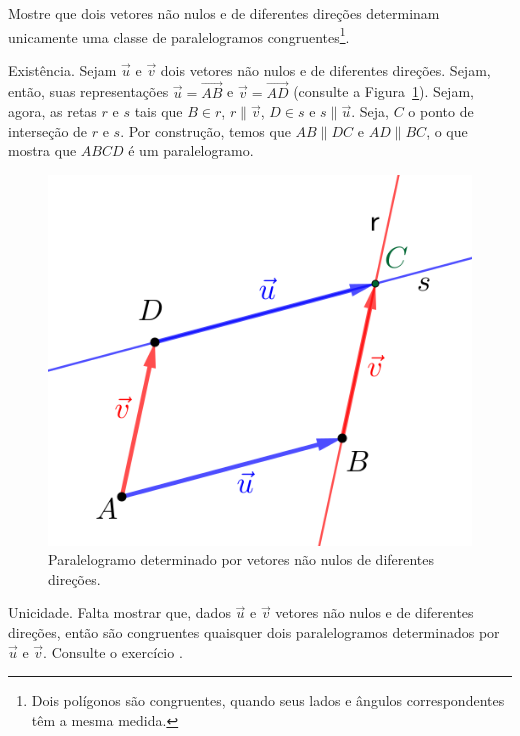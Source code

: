 \begin{exeresol}\label{cap_vetor_sec_vetor:exeresol:vetores_e_paralelogramos}
  Mostre que dois vetores não nulos e de diferentes direções determinam unicamente uma classe de paralelogramos congruentes\footnote{Dois polígonos são congruentes, quando seus lados e ângulos correspondentes têm a mesma medida.}.
\end{exeresol}
\begin{resol}
  Existência. Sejam $\vec{u}$ e $\vec{v}$ dois vetores não nulos e de diferentes direções. Sejam, então, suas representações $\vec{u}=\overrightarrow{AB}$ e $\vec{v}=\overrightarrow{AD}$ (consulte a Figura~\ref{cap_vetor_sec_vetor:fig:vetores_e_paralelogramos}). Sejam, agora, as retas $r$ e $s$ tais que $B\in r$, $r\parallel\vec{v}$, $D\in s$ e $s\parallel\vec{u}$. Seja, $C$ o ponto de interseção de $r$ e $s$. Por construção, temos que $AB\parallel DC$ e $AD\parallel BC$, o que mostra que $ABCD$ é um paralelogramo.

  \begin{figure}[h!]
    \centering
    \includegraphics{./cap_vetor/dados/fig_vetores_e_paralelogramos/fig.png}
    \caption{Paralelogramo determinado por vetores não nulos de diferentes direções.}
    \label{cap_vetor_sec_vetor:fig:vetores_e_paralelogramos}
  \end{figure}
  
  Unicidade. Falta mostrar que, dados $\vec{u}$ e $\vec{v}$ vetores não nulos e de diferentes direções, então são congruentes quaisquer dois paralelogramos determinados por $\vec{u}$ e $\vec{v}$. Consulte o exercício .
  
\end{resol}

